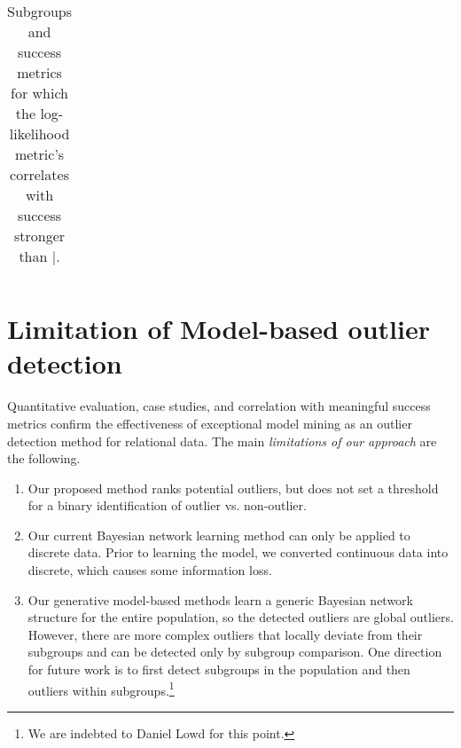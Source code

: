{\begin{table}
{\begin{tabular}{llcc}
					
				\end{tabular}
			}			\caption{Subgroups and success metrics for which the log-likelihood metric's correlates with success stronger than $\mid$.\label{table:correlationLOGELD}}
		\end{table}
		

\section{Limitation of Model-based outlier detection} 

Quantitative evaluation, case studies, and correlation with meaningful success metrics confirm the effectiveness of exceptional model mining as an outlier detection method for relational data. The main {\em limitations of our approach} are the following.



\begin{enumerate}
	\item Our proposed method ranks potential outliers, but does not set a threshold for a binary identification of outlier vs. non-outlier.
		\item Our current Bayesian network learning method can only be applied to discrete data. Prior to learning the model, we converted continuous data into discrete, which causes some information loss. 
		\item Our generative model-based methods learn a generic Bayesian network structure for the entire population, so the detected outliers are global outliers. However, there are  more complex outliers that locally deviate from their subgroups and can be detected only by subgroup comparison. One direction for future work is to first detect subgroups in the population and then outliers within subgroups.\footnote{We are indebted to Daniel Lowd for this point.}
	\end{enumerate}
	
}
